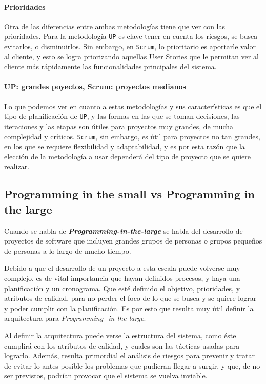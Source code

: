 \paragraph{Prioridades}
Otra de las diferencias entre ambas metodologías tiene que ver con las prioridades. Para la metodología \texttt{UP} es clave tener en cuenta los riesgos, se busca evitarlos, o disminuirlos. Sin embargo, en \texttt{Scrum}, lo prioritario es aportarle valor al cliente, y esto se logra priorizando aquellas User Stories que le permitan ver al cliente más rápidamente las funcionalidades principales del sistema.

\paragraph{UP: grandes poyectos, Scrum: proyectos medianos}
Lo que podemos ver en cuanto a estas metodologías y sus características es que el tipo de planificación de \texttt{UP}, y las formas en las que se toman decisiones, las iteraciones y las etapas son útiles para proyectos muy grandes, de mucha complejidad y críticos. \texttt{Scrum}, sin embargo, es útil para proyectos no tan grandes, en los que se requiere flexibilidad y adaptabilidad, y es por esta razón que la elección de la metodología a usar dependerá del tipo de proyecto que se quiere realizar.


\subsection{Programming in the small vs Programming in the large}

Cuando se habla de \emph{\textbf{Programming-in-the-large}} se habla del desarrollo de proyectos de software que incluyen grandes grupos de personas o grupos pequeños de personas a lo largo de mucho tiempo. \cite{Brooks}

Debido a que el desarrollo de un proyecto a esta escala puede volverse muy complejo, es de vital importancia que hayan definidos procesos, y haya una planificación y un cronograma. Que esté definido el objetivo, prioridades, y atributos de calidad, para no perder el foco de lo que se busca y se quiere lograr y poder cumplir con la planificación. 
Es por esto que resulta muy útil definir la arquitectura para \emph{Programming -in-the-large}.

Al definir la arquitectura puede verse la estructura del sistema, como éste cumplirá con los atributos de calidad, y cuales son las tácticas usadas para lograrlo.
Además, resulta primordial el análisis de riesgos para prevenir y tratar de evitar lo antes posible los problemas que pudieran llegar a surgir, y que, de no ser previstos, podrían provocar que el sistema se vuelva inviable.


